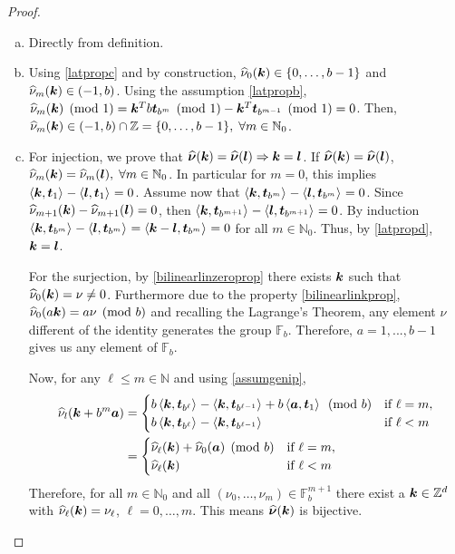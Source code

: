 \documentclass[graybox,footinfo]{svmult}
\newcommand{\Z}{\mathbb{Z}} %
\newcommand{\N}{\mathbb{N}} %
\newcommand{\F}{\mathbb{F}} %
\newcommand{\bst}{\boldsymbol{t}}    %
\begin{document}
\begin{proof}
\begin{enumerate}[a)]
\item Directly from definition.
\item Using \eqref{latpropc} and by construction, $\widehat{\nu}_0(\boldsymbol{k})\in\{0,\dots,b-1\}$ and $\widehat{\nu}_m(\boldsymbol{k})\in (-1,b)$. Using the assumption \eqref{latpropb}, $\hnu_m(\bsk)\pmod 1=\bsk^Tb\bst_{b^m}\pmod 1-\bsk^T\bst_{b^{m-1}}\pmod 1=0$. Then, $\hnu_m(\bsk)\in (-1,b)\cap\Z=\{0,\dots,b-1\},\;\forall m\in\N_0$.

\item For injection, we prove that $\widehat{\boldsymbol{\nu}}(\boldsymbol{k})=\widehat{\boldsymbol{\nu}}(\boldsymbol{l}) \Rightarrow \boldsymbol{k} = \boldsymbol{l}$. If $\widehat{\boldsymbol{\nu}}(\boldsymbol{k})=\widehat{\boldsymbol{\nu}}(\boldsymbol{l})$, $\hnu_m(\bsk)=\hnu_m(\bsl),\;\forall m\in\N_0$. In particular for $m=0$, this implies $\ip{\bsk}{\bst_1}-\ip{\bsl}{\bst_1}=0$. Assume now that $\ip{\bsk}{\bst_{b^m}}-\ip{\bsl}{\bst_{b^m}}=0$. Since $\widehat{\nu}_{m+1}(\boldsymbol{k})-\widehat{\nu}_{m+1}(\boldsymbol{l})=0$, then $\ip{\bsk}{\bst_{b^{m+1}}}-\ip{\bsl}{\bst_{b^{m+1}}}=0$. By induction $\ip{\bsk}{\bst_{b^{m}}}-\ip{\bsl}{\bst_{b^{m}}}=\ip{\bsk-\bsl}{\bst_{b^{m}}}=0$ for all $m\in\N_0$. Thus, by \eqref{latpropd}, $\boldsymbol{k}=\boldsymbol{l}$.

\vspace{2mm}
    For the surjection, by \eqref{bilinearlinzeroprop} there exists $\boldsymbol{k}$ such that $\widehat{\nu}_0(\boldsymbol{k})=\nu\neq 0$. Furthermore due to the property \eqref{bilinearlinkprop}, $\widehat{\nu}_0(a\boldsymbol{k})=a\nu \pmod b$ and recalling the Lagrange's Theorem, any element $\nu$ different of the identity generates the group $\F_b$. Therefore, $a=1,...,b-1$ gives us any element of $\F_b$.

    Now, for any $\ell\leq m\in\N$ and using \eqref{assumgenip},
\begin{align*}
\hnu_l(\bsk+b^m\bsa)&=
\begin{cases}
b\ip{\bsk}{\bst_{b^\ell}}-\ip{\bsk}{\bst_{b^{\ell-1}}}+b\ip{\bsa}{\bst_{1}} \pmod b  &\mbox{if } \ell=m, \\
b\ip{\bsk}{\bst_{b^\ell}}-\ip{\bsk}{\bst_{b^{\ell-1}}} &\mbox{if } \ell<m   \end{cases}\\
&=
\begin{cases}
\hnu_\ell(\bsk)+\hnu_0(\bsa) \pmod b  &\mbox{if } \ell=m, \\
\hnu_\ell(\bsk) &\mbox{if } \ell<m   \end{cases}\\
\end{align*}
Therefore, for all $m\in \N_0$ and all $(\nu_0,\dots,\nu_m) \in \F_b^{m+1}$ there exist a $\bsk \in \Z^d$ with $\widehat{\nu}_\ell(\boldsymbol{k})=\nu_\ell$, $\ell=0,\dots,m$. This means $\widehat{\boldsymbol{\nu}}(\boldsymbol{k})$ is bijective.


\end{enumerate}
\end{proof}
\end{document}
